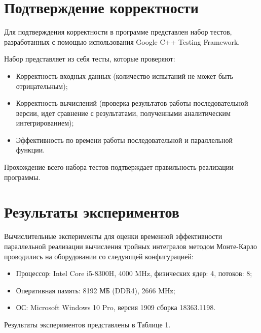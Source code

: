 \documentclass{report}
\begin{document}
\newpage

\section*{Подтверждение корректности}
Для подтверждения корректности в программе представлен набор тестов, разработанных с помощью использования Google C++ Testing Framework.
\par Набор представляет из себя тесты, которые проверяют:
\begin{itemize}
\item Корректность входных данных (количество испытаний не может быть отрицательным);
\item Корректность вычислений (проверка результатов работы последовательной версии, идет сравнение с результатами, полученными аналитическим интегрированием);
\item Эффективность по времени работы последовательной и параллельной функции.
\end{itemize}
\par Прохождение всего набора тестов подтверждает правильность реализации программы.
\newpage

\section*{Результаты экспериментов}
Вычислительные эксперименты для оценки временной эффективности параллельной реализации вычисления тройных интегралов методом Монте-Карло проводились на оборудовании со следующей конфигурацией:
\begin{itemize}
\item Процессор: Intel Core i5-8300H, 4000 MHz, физических ядер: 4, потоков: 8;
\item Оперативная память: 8192 МБ (DDR4), 2666 MHz;
\item ОС: Microsoft Windows 10 Pro, версия 1909 сборка 18363.1198.
\end{itemize}

\par Результаты экспериментов представлены в Таблице 1.
\end{document}
